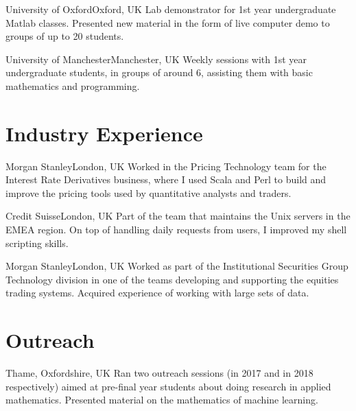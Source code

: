 \documentclass[11pt,a4paper,roman]{moderncv} %
\begin{document}
        {University of Oxford}{Oxford, UK}{}
        {
          Lab demonstrator for 1st year undergraduate Matlab classes.
          Presented new material in the form of live computer demo to groups
          of up to 20 students.
        }

        {University of Manchester}{Manchester, UK}{}
        {
          Weekly sessions with 1st year 
          undergraduate students, in groups of around 6,
          assisting them with basic mathematics and programming.
        }


\section{Industry Experience}

        {Morgan Stanley}{London, UK}{}
        {
          Worked in the Pricing Technology team for the Interest 
          Rate Derivatives business, where I used Scala and Perl 
          to build and improve the pricing tools used 
          by quantitative analysts and traders. 
        }

        {Credit Suisse}{London, UK}{}
        {
          Part of the team that maintains the Unix servers in the 
          EMEA region. On top of handling daily requests from users, 
          I improved my shell scripting skills.
        }

        {Morgan Stanley}{London, UK}{}
        {
          Worked as part of the Institutional Securities Group Technology 
          division in one of the teams developing and supporting the equities 
          trading systems. Acquired experience of working with large sets of data.
        }

\section{Outreach}

        {Thame, Oxfordshire, UK}{}{}
        {
          Ran two outreach sessions (in 2017 and in 2018 respectively) 
          aimed at pre-final year 
          students about doing research in applied mathematics.
          Presented material on the mathematics of machine learning.
        }
\end{document}
